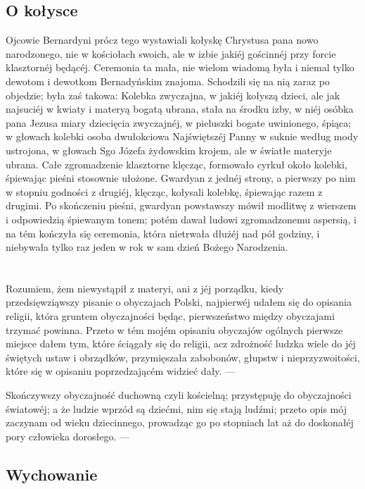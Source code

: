 \documentclass{book}
\begin{document}
\section{O kołysce}
Ojcowie Bernardyni prócz tego wystawiali kołyskę Chrystusa pana nowo narodzonego, nie w kościołach swoich, ale w izbie jakiéj gościnnéj przy forcie klasztornéj będącéj. Ceremonia ta mała, nie wielom wiadomą była i niemal tylko dewotom i dewotkom Bernadyńskim znajoma. Schodzili się na nią zaraz po objedzie; była zaś takowa: Kolebka zwyczajna, w jakiéj kołyszą dzieci, ale jak najsuciéj w kwiaty i materyą bogatą ubrana, stała na środku izby, w niéj osóbka pana Jezusa miary dziecięcia zwyczajnéj, w pieluszki bogate uwinionego, śpiąca; w głowach kolebki osoba dwułokciowa Najświętszéj Panny w suknie według mody ustrojona, w głowach Sgo Józefa żydowskim krojem, ale w światłe materyje ubrana. Całe zgromadzenie klasztorne klęcząc, formowało cyrkuł około kolebki, śpiewając pieśni stosownie ułożone. Gwardyan z jednéj strony, a pierwszy po nim w stopniu godności z drugiéj, klęcząc, kołysali kolebkę, śpiewając razem z drugimi. Po skończeniu pieśni, gwardyan powstawszy mówił modlitwę z wierszem i odpowiedzią śpiewanym tonem; potém dawał ludowi zgromadzonemu aspersią, i na tém kończyła się ceremonia, która nietrwała dłużéj nad pół godziny, i niebywała tylko raz jeden w rok w sam dzień Bożego Narodzenia.


\chapter{}

Rozumiem, żem niewystąpił z materyi, ani z jéj porządku, kiedy przedsięwziąwszy pisanie o obyczajach Polski, najpierwéj udałem się do opisania religii, która gruntem obyczajności będąc, pierwszeństwo między obyczajami trzymać powinna. Przeto w tém mojém opisaniu obyczajów ogólnych pierwsze miejsce dałem tym, które ściągały się do religii, acz zdrożność ludzka wiele do jéj świętych ustaw i obrządków, przymięszała zabobonów, głupstw i nieprzyzwoitości, które się w opisaniu poprzedzającém widzieć dały. —

Skończywszy obyczajność duchowną czyli kościelną; przystępuję do obyczajności światowéj; a że ludzie wprzód są dziećmi, nim się stają ludźmi; przeto opis mój zaczynam od wieku dziecinnego, prowadząc go po stopniach lat aż do doskonałéj pory człowieka dorosłego. —

\section{Wychowanie}
\end{document}
